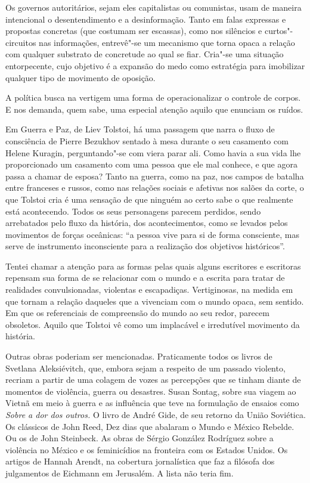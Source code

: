 Os governos autoritários, sejam eles capitalistas ou comunistas, usam de
maneira intencional o desentendimento e a desinformação. Tanto em falas
expressas e propostas concretas (que costumam ser escassas), como nos
silêncios e curtos"-circuitos nas informações, entrevê"-se um mecanismo
que torna opaca a relação com qualquer substrato de concretude ao qual
se fiar. Cria"-se uma situação entorpecente, cujo objetivo é a expansão
do medo como estratégia para imobilizar qualquer tipo de movimento de
oposição.

A política busca na vertigem uma forma de operacionalizar o controle de
corpos. E nos demanda, quem sabe, uma especial atenção aquilo que
enunciam os ruídos.

\asterisc

Em Guerra e Paz, de Liev Tolstoi, há uma passagem que narra o fluxo de
consciência de Pierre Bezukhov sentado à mesa durante o seu casamento
com Helene Kuragin, perguntando"-se com viera parar ali. Como havia a sua
vida lhe proporcionado um casamento com uma pessoa que ele mal conhece,
e que agora passa a chamar de esposa? Tanto na guerra, como na paz, nos
campos de batalha entre franceses e russos, como nas relações sociais e
afetivas nos salões da corte, o que Tolstoi cria é uma sensação de que
ninguém ao certo sabe o que realmente está acontecendo. Todos os seus
personagens parecem perdidos, sendo arrebatados pelo fluxo da história,
dos acontecimentos, como se levados pelos movimentos de forças
oceânicas: ``a pessoa vive para si de forma consciente, mas serve de
instrumento inconsciente para a realização dos objetivos históricos''.

Tentei chamar a atenção para as formas pelas quais alguns escritores e
escritoras repensam sua forma de se relacionar com o mundo e a escrita
para tratar de realidades convulsionadas, violentas e escapadiças.
Vertiginosas, na medida em que tornam a relação daqueles que a vivenciam
com o mundo opaca, sem sentido. Em que os referenciais de compreensão do
mundo ao seu redor, parecem obsoletos. Aquilo que Tolstoi vê como um
implacável e irredutível movimento da história.

Outras obras poderiam ser mencionadas. Praticamente todos os livros de
Svetlana Aleksiévitch, que, embora sejam a respeito de um passado
violento, recriam a partir de uma colagem de vozes as percepções que se
tinham diante de momentos de violência, guerra ou desastres. Susan
Sontag, sobre sua viagem ao Vietnã em meio à guerra e as influência que
teve na formulação de ensaios como \emph{Sobre a dor dos outros.} O
livro de André Gide, de seu retorno da União Soviética. Os clássicos de
John Reed, Dez dias que abalaram o Mundo e México Rebelde. Ou os de John
Steinbeck. As obras de Sérgio González Rodríguez sobre a violência no
México e os feminicídios na fronteira com os Estados Unidos. Os artigos
de Hannah Arendt, na cobertura jornalística que faz a filósofa dos
julgamentos de Eichmann em Jerusalém. A lista não teria fim.

